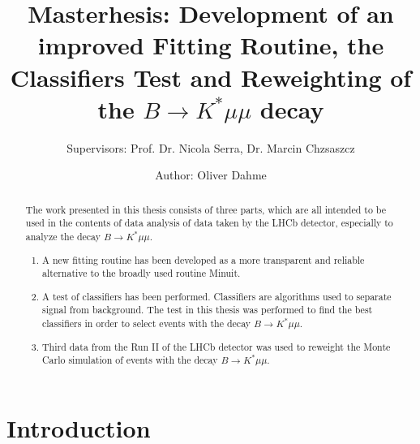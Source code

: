 \documentclass[english]{uzhpub}
\begin{document}
\title{Masterhesis: Development of an improved Fitting Routine, the Classifiers Test and Reweighting of the $B \rightarrow K^* \mu \mu$ decay}
\subtitle{Supervisors: Prof. Dr. Nicola Serra, Dr. Marcin Chzsaszcz}

\author{Author: Oliver Dahme}


\maketitle




\begin{abstract}
  The work presented in this thesis consists of three parts, which are all intended to be used in the contents of data analysis of data taken by the LHCb detector, especially to analyze the decay $B \rightarrow K^* \mu \mu$.
  \begin{enumerate}
    \item A new fitting routine has been developed as a more transparent and reliable alternative to the broadly used routine Minuit.
    \item A test of classifiers has been performed. Classifiers are algorithms used to separate signal from background. The test in this thesis was performed to find the best classifiers in order to select events with the decay $B \rightarrow K^* \mu \mu$.
    \item Third data from the Run II of the LHCb detector was used to reweight the Monte Carlo simulation of events with the decay $B \rightarrow K^* \mu \mu$.
  \end{enumerate}
\end{abstract}

\tableofcontents


\section{Introduction}
\end{document}
